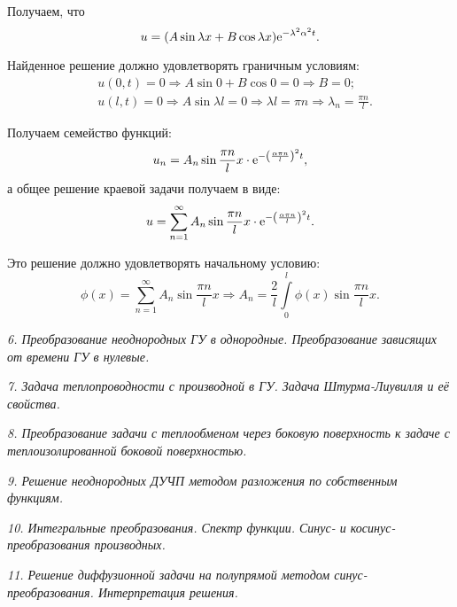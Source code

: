 Получаем, что
\[
    u = (A\sin\lambda x + B\cos\lambda x)\mathrm{e}^{-\lambda^2\alpha^2 t}.
\]

Найденное решение должно удовлетворять граничным условиям:
\begin{align*}
    & u(0, t) = 0 \Rightarrow A\sin0 + B\cos0 = 0 \Rightarrow B = 0; \\
    & u(l, t) = 0 \Rightarrow A\sin\lambda l = 0 \Rightarrow \lambda l = \pi n
    \Rightarrow \lambda_n = \frac{\pi n}{l}.
\end{align*}

Получаем семейство функций:
\[
    u_n = A_n\sin\frac{\pi n}{l}x \cdot \mathrm{e}^{-\left(\frac{\alpha\pi n}
    {l}\right)^2t},
\]
а общее решение краевой задачи получаем в виде:
\[
    u = \sum\limits_{n = 1}^\infty A_n\sin\frac{\pi n}{l}x \cdot
    \mathrm{e}^{-\left(\frac{\alpha\pi n}{l}\right)^2t}.
\]

Это решение должно удовлетворять начальному условию:
\[
    \phi(x) = \sum\limits_{n = 1}^\infty A_n\sin\frac{\pi n}{l}x \Rightarrow
    A_n = \frac{2}{l}\int\limits_0^l \phi(x)\sin\frac{\pi n}{l}x.
\]

\newpage %

\emph{6. Преобразование неоднородных ГУ в однородные. Преобразование зависящих
от времени ГУ в нулевые.}

\newpage %

\emph{7. Задача теплопроводности с производной в ГУ. Задача Штурма-Лиувилля и её
свойства.}

\newpage %

\emph{8. Преобразование задачи с теплообменом через боковую поверхность к задаче
с теплоизолированной боковой поверхностью.}

\newpage %

\emph{9. Решение неоднородных ДУЧП методом разложения по собственным функциям.}

\newpage %

\emph{10. Интегральные преобразования. Спектр функции. Синус- и
косинус-преобразования производных.}

\newpage %

\emph{11. Решение диффузионной задачи на полупрямой методом
синус-преобразования. Интерпретация решения.}

